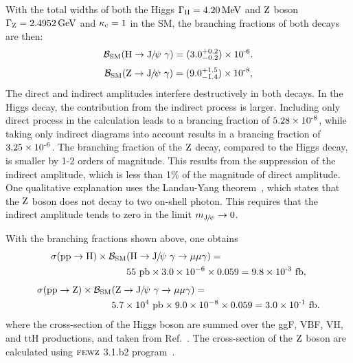 With the total widths of both the Higgs $\Gamma_{\mathrm{H}}=4.20\,\text{Me\hspace{-.08em}V}$ and $\mathrm{Z}$ boson $\Gamma_{\mathrm{Z}}=2.4952\,\text{Ge\hspace{-.08em}V}$ and $\kappa_{\mathrm{c}}=1$ in the SM, the branching fractions of both decays are then:
\begin{equation}
\mathcal{B}_{\text{SM}}(\PH\to\JPsi\ \gamma)=(3.0^{+0.2}_{-0.2})\ten{-6}.
\end{equation}
\begin{equation}
\mathcal{B}_{\text{SM}}(\cPZ\to\JPsi\ \gamma)=(9.0^{+1.5}_{-1.4})\ten{-8},
\end{equation}
The direct and indirect amplitudes interfere destructively in both decays. In the Higgs decay, the contribution from the indirect process is larger. Including only direct process in the calculation leads to a brancing fraction of $5.28\times \text{10}^\text{-8}$, while taking only indirect diagrams into account results in a brancing fraction of $3.25\times \text{10}^\text{-6}$. The branching fraction of the $\mathrm{Z}$ decay, compared to the Higgs decay, is smaller by 1-2 orders of magnitude. This results from the suppression of the indirect amplitude, which is less than 1\% of the magnitude of direct amplitude. One qualitative explanation uses the Landau-Yang theorem~\cite{PhysRev.77.242}, which states that the $\mathrm{Z}$ boson does not decay to two on-shell photon. This requires that the indirect amplitude tends to zero in the limit $m_{{\mathrm{J}\hspace{-.08em}/\hspace{-.14em}\psi}}\to 0$.

With the branching fractions shown above, one obtains
\begin{equation}  
\begin{split}
\sigma(\Pp\Pp\to\PH) \times \mathcal{B}_{\text{SM}}&(\PH\to\JPsi\ \gamma\to\mu\mu\gamma) = \\
& 55\ \text{pb} \times 3.0\times10^{-6} \times 0.059 = 9.8\ten{-3}\ \text{fb},
\end{split}
\end{equation}  
\begin{equation} 
\begin{split}
\sigma(\Pp\Pp\to\cPZ) \times \mathcal{B}_{\text{SM}}&(\cPZ\to\JPsi\ \gamma\to\mu\mu\gamma) =\\
& 5.7\times 10^{4}\ \text{pb} \times 9.0\times10^{-8} \times 0.059 = 3.0\ten{-1}\ \text{fb}.
\end{split}
\end{equation}
where the cross-section of the Higgs boson are summed over the ggF, VBF, VH, and ttH productions, and taken from Ref.~\cite{deFlorian:2016spz}. The cross-section of the $\mathrm{Z}$ boson are calculated using ${\textsc{fewz}}$ 3.1.b2 program~\cite{Li:2012wna}.

